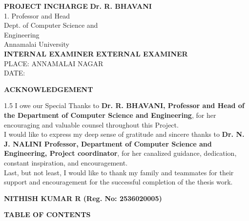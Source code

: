 \documentclass[12pt,a4paper]{report}
\begin{document}
\vspace{2cm}
\noindent \textbf{PROJECT INCHARGE} \hfill \textbf{Dr. R. BHAVANI} \\
1. \null \hfill Professor and Head \\
\null \hfill Dept. of Computer Science and \\
\null \hfill Engineering \\
\null \hfill Annamalai University \\

\vspace{1.5cm}
\noindent \textbf{INTERNAL EXAMINER} \hfill \textbf{EXTERNAL EXAMINER} \\

\vfill
\noindent PLACE: ANNAMALAI NAGAR \\
DATE:

\newpage
\begin{center}
    \textbf{ACKNOWLEDGEMENT}
\end{center}
\vspace{1cm}
\begin{spacing}{1.5}
I owe our Special Thanks to \textbf{Dr. R. BHAVANI, Professor and Head of the Department of Computer Science and Engineering}, for her encouraging and valuable counsel throughout this Project. \\

I would like to express my deep sense of gratitude and sincere thanks to \textbf{Dr. N. J. NALINI Professor, Department of Computer Science and Engineering, Project coordinator}, for her canalized guidance, dedication, constant inspiration, and encouragement. \\

Last, but not least, I would like to thank my family and teammates for their support and encouragement for the successful completion of the thesis work.
\end{spacing}

\vspace{2cm}
\begin{center}
    \textbf{NITHISH KUMAR R \quad (Reg. No: 2536020005)}
\end{center}
\newpage
\begin{center}
    \textbf{TABLE OF CONTENTS}
\end{center}
\vspace{0.5cm}

\renewcommand{\arraystretch}{1.5} 
\end{document}
